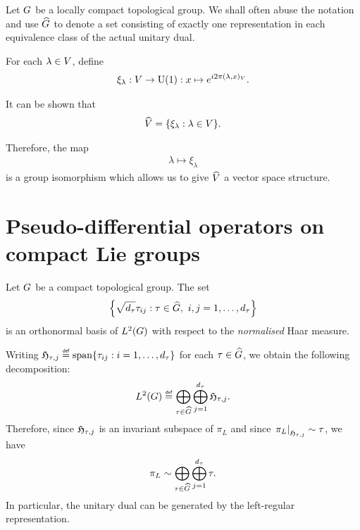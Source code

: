 \begin{remark}
    Let $G$ be a locally compact topological group.
    We shall often abuse the notation and use ${\widehat{G}}$ to denote a set consisting of
    exactly one representation in each equivalence class of the actual unitary dual.
\end{remark}

\begin{example}[$\dualGroup\VectorSpace$]
    For each $\lambda \in V$,
    define
    \begin{align}
        \xi_\lambda : V \to {\mathrm{U} (1)} : x \mapsto e^{i 2 \pi {(\lambda, x)_{V}}}.
        \label{eq:elements_of_dual_of_vector_space}
    \end{align}

    It can be shown that
    \begin{align*}
        {\widehat{V}} = \{ \xi_\lambda : \lambda \in V \}.
    \end{align*}

    Therefore, the map
    \begin{align}
        \lambda \mapsto \xi_\lambda
        \label{eq:isomorphism_between_vector_space_and_its_dual_group}
    \end{align}
    is a group isomorphism which allows us to give $\dualGroup\VectorSpace$ a vector space structure.
\end{example}

\section{Pseudo-differential operators on compact Lie groups}

\begin{theorem}
\label{theorem:Peter-Weyl_theorem}
    Let $G$ be a compact topological group.
    The set
    \begin{align*}
        \left\{
            \sqrt{\dimRep\tau} \tau_{ij} : \tau \in \dualGroup\Group,\ i, j = 1, \dots, \dimRep\tau
        \right\}
    \end{align*}
    is an orthonormal basis of ${L^{2} (G)}$ with respect to the \emph{normalised} Haar measure.

    Writing $\Hilbert{\tau}{j} \defeq \Span\{\tau_{ij} : i = 1, \dots, \dimRep\tau\}$
    for each $\tau \in {\widehat{G}}$,
    we obtain the following decomposition:
    \begin{align*}
        \Lebesgue{2}{\Group} \defeq
        \bigoplus_{\tau \in \dualGroup\Group} \bigoplus_{j = 1}^{\dimRep \tau} \Hilbert{\tau}{j}.
    \end{align*}
    Therefore,
    since $\mathfrak{H}_{\tau, j}$ is an invariant subspace of $\pi_L$
    and since $\left. \pi_L \right|_{\mathfrak{H}_{\tau, j}} \sim \tau$,
    we have
    \begin{align*}
        \pi_L \sim
        \bigoplus_{\tau \in {\widehat{G}}} \bigoplus_{j = 1}^{{d_{\tau}}} \tau.
    \end{align*}
    In particular, the unitary dual can be generated by the left-regular representation.
\end{theorem}

